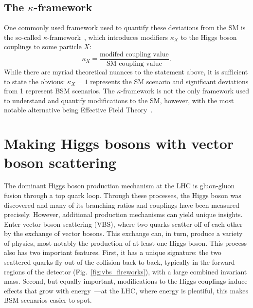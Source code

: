 \subsection{The $\kappa$-framework}
One commonly used framework used to quantify these deviations from the SM is the so-called $\kappa$-framework~\cite{KFrame}, which introduces modifiers $\kappa_X$ to the Higgs boson couplings to some particle $X$:
\begin{equation}
    \kappa_X = \frac{\text{modifed coupling value}}{\text{SM coupling value}}.
\end{equation}
While there are myriad theoretical nuances to the statement above, it is sufficient to state the obvious: $\kappa_X = 1$ represents the SM scenario and significant deviations from 1 represent BSM scenarios. 
The $\kappa$-framework is not the only framework used to understand and quantify modifications to the SM, however, with the most notable alternative being Effective Field Theory~\cite{EFT, DimSix}. 

\section{Making Higgs bosons with vector boson scattering}
The dominant Higgs boson production mechanism at the LHC is gluon-gluon fusion through a top quark loop. %
Through these processes, the Higgs boson was discovered and many of its branching ratios and couplings have been measured precisely. 
However, additional production mechanisms can yield unique insights. 
Enter vector boson scattering\footnotemark{} (VBS), where two quarks scatter off of each other by the exchange of vector bosons. %
This exchange can, in turn, produce a variety of physics, most notably the production of at least one Higgs boson. 
This process also has two important features. 
First, it has a unique signature: the two scattered quarks fly out of the collision back-to-back, typically in the forward regions of the detector (Fig.~\ref{fig:vbs_fireworks}), with a large combined invariant mass. 
Second, but equally important, modifications to the Higgs couplings induce effects that grow with energy~\cite{HiggsWithoutHiggs}---at the LHC, where energy is plentiful, this makes BSM scenarios easier to spot. 

